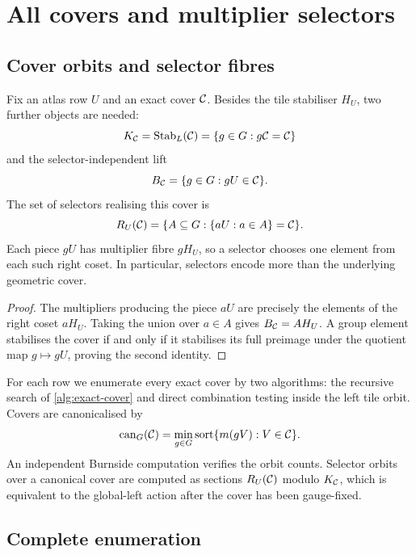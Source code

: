 \section{All covers and multiplier selectors}\label{sec:covers}

\subsection{Cover orbits and selector fibres}

Fix an atlas row $U$ and an exact cover $\mathcal C$.  Besides the tile stabiliser
$H_U$, two further objects are needed:
\[
 K_\mathcal C=\operatorname{Stab}_L(\mathcal C)=\{g\in G:g\mathcal C=\mathcal C\}
\]
and the selector-independent lift
\[
 B_\mathcal C=\{g\in G:gU\in\mathcal C\}.
\]
The set of selectors realising this cover is
\[
 R_U(\mathcal C)=\{A\subseteq G:\{aU:a\in A\}=\mathcal C\}.
\]
Each piece $gU$ has multiplier fibre $gH_U$, so a selector chooses one
element from each such right coset.  In particular, selectors encode more
than the underlying geometric cover.

\begin{proof}
The multipliers producing the piece $aU$ are precisely the elements of the
right coset $aH_U$.  Taking the union over $a\in A$ gives $B_\mathcal C=AH_U$.
A group element stabilises the cover if and only if it stabilises its full
preimage under the quotient map $g\mapsto gU$, proving the second identity.
\end{proof}

For each row we enumerate every exact cover by two algorithms: the recursive
search of \cref{alg:exact-cover} and direct combination testing inside the
left tile orbit.  Covers are canonicalised by
\[
 \operatorname{can}_G(\mathcal C)=
 \min_{g\in G}\operatorname{sort}\{m(gV):V\in\mathcal C\}.
\]
An independent Burnside computation verifies the orbit counts.  Selector
orbits over a canonical cover are computed as sections $R_U(\mathcal C)$ modulo
$K_\mathcal C$, which is equivalent to the global-left action after the cover has
been gauge-fixed.

\subsection{Complete enumeration}

